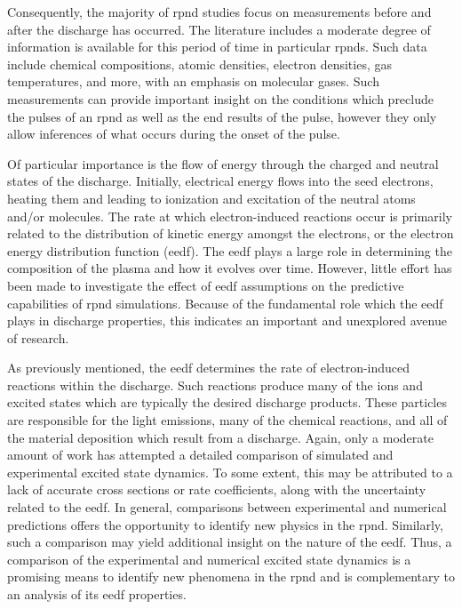 Consequently, the majority of \acs{rpnd} studies focus on measurements before
and after the discharge has occurred. The literature includes a moderate degree
of information is available for this period of time in particular \acs{rpnd}s.
Such data include chemical compositions, atomic densities, electron densities,
gas temperatures, and more, with an emphasis on molecular gases. Such
measurements can provide important insight on the conditions which preclude the
pulses of an \acs{rpnd} as well as the end results of the pulse, however they
only allow inferences of what occurs during the onset of the pulse.

Of particular importance is the flow of energy through the charged and neutral
states of the discharge. Initially, electrical energy flows into the seed
electrons, heating them and leading to ionization and excitation of the neutral
atoms and/or molecules. The rate at which electron-induced reactions occur is
primarily related to the distribution of kinetic energy amongst the electrons,
or the electron energy distribution function (\acs{eedf}). The \acs{eedf} plays
a large role in determining the composition of the plasma and how it evolves
over time. However, little effort has been made to investigate the effect of
\acs{eedf} assumptions on the predictive capabilities of \acs{rpnd} simulations.
Because of the fundamental role which the \acs{eedf} plays in discharge
properties, this indicates an important and unexplored avenue of research.

As previously mentioned, the \acs{eedf} determines the rate of electron-induced
reactions within the discharge. Such reactions produce many of the ions and
excited states which are typically the desired discharge products. These
particles are responsible for the light emissions, many of the chemical
reactions, and all of the material deposition which result from a discharge.
Again, only a moderate amount of work has attempted a detailed comparison of
simulated and experimental excited state dynamics. To some extent, this may be
attributed to a lack of accurate cross sections or rate coefficients, along with
the uncertainty related to the \acs{eedf}. In general, comparisons between
experimental and numerical predictions offers the opportunity to identify new
physics in the \acs{rpnd}. Similarly, such a comparison may yield additional
insight on the nature of the \acs{eedf}. Thus, a comparison of the experimental
and numerical excited state dynamics is a promising means to identify new
phenomena in the \acs{rpnd} and is complementary to an analysis of its
\acs{eedf} properties.

